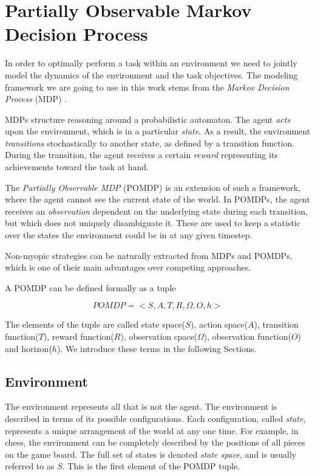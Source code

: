 \section{Partially Observable Markov Decision Process}\label{ref:pomdp}

In order to optimally perform a task within an environment we need to jointly model the dynamics of
the environment and the task objectives. The modeling framework we are going to use in this work
stems from the \textit{Markov Decision Process} (MDP) \cite{cit:suttonbarto}.

MDPs structure reasoning around a probabilistic automaton. The agent \textit{acts} upon the
environment, which is in a particular \textit{state}. As a result, the environment
\textit{transitions} stochastically to another state, as defined by a transition function. During
the transition, the agent receives a certain \textit{reward} representing its achievements
toward the task at hand.

The \textit{Partially Observable MDP} (POMDP) \cite{cit:pomdp} is an extension of such a framework,
where the agent cannot see the current state of the world. In POMDPs, the agent receives an
\textit{observation} dependent on the underlying state during each transition, but which does not
uniquely disambiguate it. These are used to keep a statistic over the states the environment could
be in at any given timestep.

Non-myopic strategies can be naturally extracted from MDPs and POMDPs, which is one of their main
advantages over competing approaches.

A POMDP can be defined formally as a tuple

\[ POMDP = <S,A,T,R,\Omega,O,h> \]

The elements of the tuple are called state space($S$), action space($A$), transition function($T$),
reward function($R$), observation space($\Omega$), observation function($O$) and horizon($h$). We
introduce these terms in the following Sections.

\subsection{Environment}

The environment represents all that is not the agent. The environment is described in terms of its
possible configurations.  Each configuration, called \textit{state}, represents a unique
arrangement of the world at any one time. For example, in chess, the environment can be completely
described by the positions of all pieces on the game board. The full set of states is denoted
\textit{state space}, and is usually referred to as $S$. This is the first element of the POMDP
tuple.

